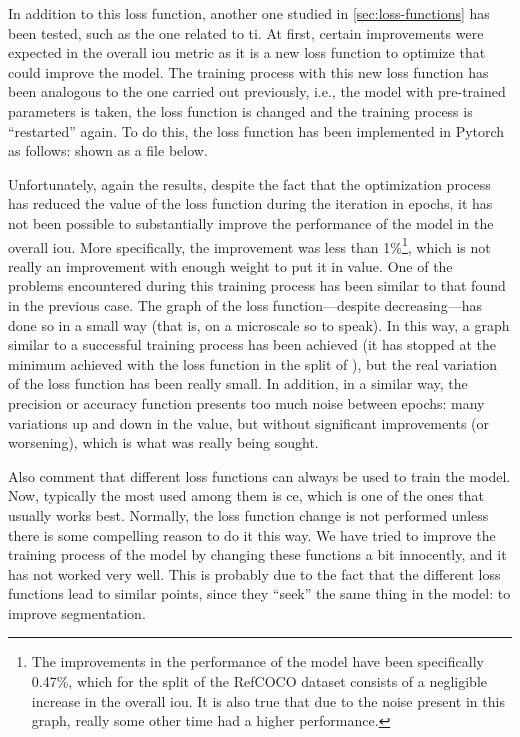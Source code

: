 In addition to this loss function, another one studied in
\vref{sec:loss-functions} has been tested, such as the one related to
\gls{ti}. At first, certain improvements were expected in the overall \gls{iou}
metric as it is a new loss function to optimize that could improve the
model. The training process with this new loss function has been analogous to
the one carried out previously, i.e., the model with pre-trained parameters is
taken, the loss function is changed and the training process is ``restarted''
again. To do this, the loss function has been implemented in Pytorch as
follows: shown as a file below.


Unfortunately, again the results, despite the fact that the optimization
process has reduced the value of the loss function during the iteration in
epochs, it has not been possible to substantially improve the performance of
the model in the overall \gls{iou}. More specifically, the improvement was less
than 1\%\footnote{The improvements in the performance of the model have been
  specifically 0.47\%, which for the  split of the RefCOCO dataset
  consists of a negligible increase in the overall \gls{iou}. It is also true
  that due to the noise present in this graph, really some other time had a
  higher performance.}, which is not really an improvement with enough weight
to put it in value. One of the problems encountered during this training
process has been similar to that found in the previous case. The graph of the
loss function---despite decreasing---has done so in a small way (that is, on a
microscale so to speak). In this way, a graph similar to a successful training
process has been achieved (it has stopped at the minimum achieved with the loss
function in the split of ), but the real variation of the loss
function has been really small. In addition, in a similar way, the precision or
accuracy function presents too much noise between epochs: many variations up
and down in the value, but without significant improvements (or worsening),
which is what was really being sought.

Also comment that different loss functions can always be used to train the
model. Now, typically the most used among them is \gls{ce}, which is one of the
ones that usually works best. Normally, the loss function change is not
performed unless there is some compelling reason to do it this way. We have
tried to improve the training process of the model by changing these functions
a bit innocently, and it has not worked very well. This is probably due to the
fact that the different loss functions lead to similar points, since they
``seek'' the same thing in the model: to improve segmentation.


